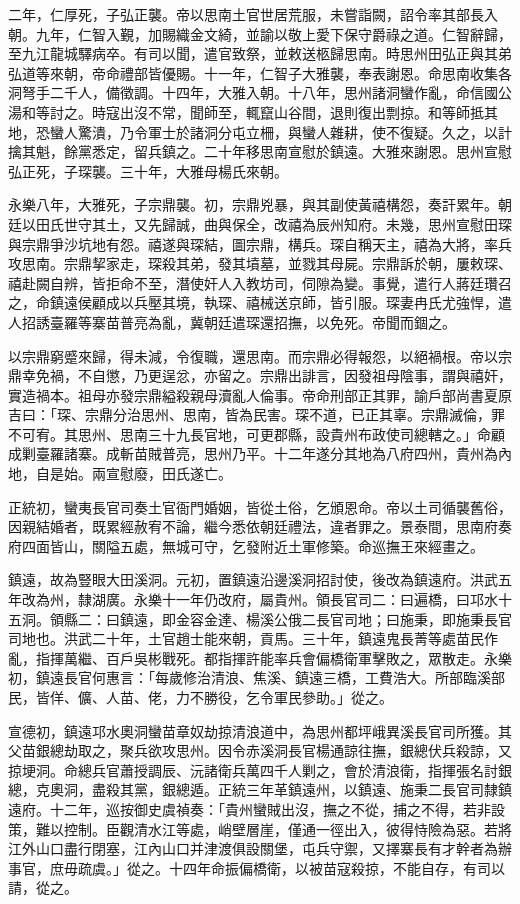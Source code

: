 \begin{pinyinscope}
二年，仁厚死，子弘正襲。帝以思南土官世居荒服，未嘗詣闕，詔令率其部長入朝。九年，仁智入覲，加賜織金文綺，並諭以敬上愛下保守爵祿之道。仁智辭歸，至九江龍城驛病卒。有司以聞，遣官致祭，並敕送柩歸思南。時思州田弘正與其弟弘道等來朝，帝命禮部皆優賜。十一年，仁智子大雅襲，奉表謝恩。命思南收集各洞弩手二千人，備徵調。十四年，大雅入朝。十八年，思州諸洞蠻作亂，命信國公湯和等討之。時寇出沒不常，聞師至，輒竄山谷間，退則復出剽掠。和等師抵其地，恐蠻人驚潰，乃令軍士於諸洞分屯立柵，與蠻人雜耕，使不復疑。久之，以計擒其魁，餘黨悉定，留兵鎮之。二十年移思南宣慰於鎮遠。大雅來謝恩。思州宣慰弘正死，子琛襲。三十年，大雅母楊氏來朝。

永樂八年，大雅死，子宗鼎襲。初，宗鼎兇暴，與其副使黃禧構怨，奏訐累年。朝廷以田氏世守其土，又先歸誠，曲與保全，改禧為辰州知府。未幾，思州宣慰田琛與宗鼎爭沙坑地有怨。禧遂與琛結，圖宗鼎，構兵。琛自稱天主，禧為大將，率兵攻思南。宗鼎挈家走，琛殺其弟，發其墳墓，並戮其母屍。宗鼎訴於朝，屢敕琛、禧赴闕自辨，皆拒命不至，潛使奸人入教坊司，伺隙為變。事覺，遣行人蔣廷瓚召之，命鎮遠侯顧成以兵壓其境，執琛、禧械送京師，皆引服。琛妻冉氏尤強悍，遣人招誘臺羅等寨苗普亮為亂，冀朝廷遣琛還招撫，以免死。帝聞而錮之。

以宗鼎窮蹙來歸，得未減，令復職，還思南。而宗鼎必得報怨，以絕禍根。帝以宗鼎幸免禍，不自懲，乃更逞忿，亦留之。宗鼎出誹言，因發祖母陰事，謂與禧奸，實造禍本。祖母亦發宗鼎縊殺親母瀆亂人倫事。帝命刑部正其罪，諭戶部尚書夏原吉曰：「琛、宗鼎分治思州、思南，皆為民害。琛不道，已正其辜。宗鼎滅倫，罪不可宥。其思州、思南三十九長官地，可更郡縣，設貴州布政使司總轄之。」命顧成剿臺羅諸寨。成斬苗賊普亮，思州乃平。十二年遂分其地為八府四州，貴州為內地，自是始。兩宣慰廢，田氏遂亡。

正統初，蠻夷長官司奏土官衙門婚姻，皆從土俗，乞頒恩命。帝以土司循襲舊俗，因親結婚者，既累經赦宥不論，繼今悉依朝廷禮法，違者罪之。景泰間，思南府奏府四面皆山，關隘五處，無城可守，乞發附近土軍修築。命巡撫王來經畫之。

鎮遠，故為豎眼大田溪洞。元初，置鎮遠沿邊溪洞招討使，後改為鎮遠府。洪武五年改為州，隸湖廣。永樂十一年仍改府，屬貴州。領長官司二：曰遍橋，曰邛水十五洞。領縣二：曰鎮遠，即金容金達、楊溪公俄二長官司地；曰施秉，即施秉長官司地也。洪武二十年，土官趙士能來朝，貢馬。三十年，鎮遠鬼長菁等處苗民作亂，指揮萬繼、百戶吳彬戰死。都指揮許能率兵會偏橋衛軍擊敗之，眾散走。永樂初，鎮遠長官何惠言：「每歲修治清浪、焦溪、鎮遠三橋，工費浩大。所部臨溪部民，皆佯、儣、人苗、佬，力不勝役，乞令軍民參助。」從之。

宣德初，鎮遠邛水奧洞蠻苗章奴劫掠清浪道中，為思州都坪峨異溪長官司所獲。其父苗銀總劫取之，聚兵欲攻思州。因令赤溪洞長官楊通諒往撫，銀總伏兵殺諒，又掠埂洞。命總兵官蕭授調辰、沅諸衛兵萬四千人剿之，會於清浪衛，指揮張名討銀總，克奧洞，盡殺其黨，銀總遁。正統三年革鎮遠州，以鎮遠、施秉二長官司隸鎮遠府。十二年，巡按御史虞禎奏：「貴州蠻賊出沒，撫之不從，捕之不得，若非設策，難以控制。臣觀清水江等處，峭壁層崖，僅通一徑出入，彼得恃險為惡。若將江外山口盡行閉塞，江內山口并津渡俱設關堡，屯兵守禦，又擇寨長有才幹者為辦事官，庶毋疏虞。」從之。十四年命振偏橋衛，以被苗寇殺掠，不能自存，有司以請，從之。


\end{pinyinscope}

